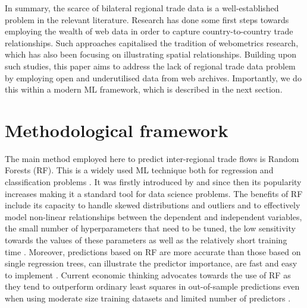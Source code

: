 \documentclass[sigconf]{acmart}
\begin{document}
In summary, the scarce of bilateral regional trade data is a
well-established problem in the relevant literature. Research has done
some first steps towards employing the wealth of web data in order to
capture country-to-country trade relationships. Such approaches
capitalised the tradition of webometrics research, which has also been
focusing on illustrating spatial relationships. Building upon such
studies, this paper aims to address the lack of regional trade data
problem by employing open and underutilised data from web archives.
Importantly, we do this within a modern ML framework, which is described
in the next section.

\hypertarget{sec:3}{%
	\section{Methodological framework}\label{sec:3}}

The main method employed here to predict inter-regional trade flows is
Random Forests (RF). This is a widely used ML technique both for
regression and classification problems \citep{biau2012analysis}. It was
firstly introduced by \citet{breiman2001random} and since then its
popularity increases making it a standard tool for data science
problems. The benefits of RF include its capacity to handle skewed
distributions and outliers and to effectively model non-linear
relationships between the dependent and independent variables, the small
number of hyperparameters that need to be tuned, the low sensitivity
towards the values of these parameters as well as the relatively short
training time \citep{Caruana2008, liaw2002classification, yan2020using}.
Moreover, predictions based on RF are more accurate than those based on
single regression trees, can illustrate the predictor importance, are
fast and easy to implement
\citep{breiman2001random, sulaiman2011intelligent, pourebrahim2019trip, biau2012analysis}.
Current economic thinking advocates towards the use of RF as they tend
to outperform ordinary least squares in out-of-sample predictions even
when using moderate size training datasets and limited number of
predictors \citep{mullainathan2017machine, athey2019machine}.
\end{document}
